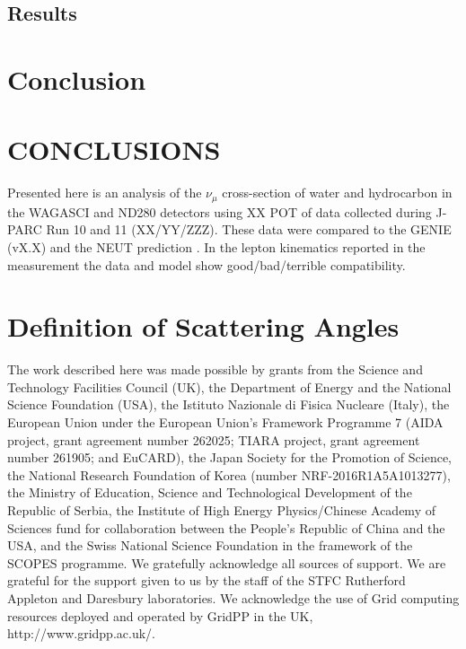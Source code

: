 \documentclass[%
 reprint,
 amsmath,amssymb,
 aps,
]{revtex4-2}
\begin{document}
\subsection{Results}

\section{\label{Sect:Results}Conclusion}

\section{\label{Sect:Conclusions}CONCLUSIONS}

Presented here is an analysis of the $\nu_{\mu}$ cross-section of water and hydrocarbon in the WAGASCI and ND280 detectors using XX POT of data collected during J-PARC Run 10 and 11 (XX/YY/ZZZ). These data were compared to the GENIE (vX.X) \cite{} and the NEUT prediction \cite{}. In the lepton kinematics reported in the measurement the data and model show good/bad/terrible compatibility. 
\newpage
\appendix*

\section{\label{Sect:Appendix}Definition of Scattering Angles}


\begin{acknowledgments}
The work described here was made possible by grants from the Science and Technology Facilities Council (UK), the Department of Energy and the National Science Foundation (USA), the Istituto Nazionale di Fisica Nucleare (Italy), the European Union under the European Union’s Framework Programme 7 (AIDA project, grant agreement number 262025; TIARA project, grant agreement number 261905; and EuCARD), the Japan Society for the Promotion of Science, the National Research Foundation of Korea (number NRF-2016R1A5A1013277), the Ministry of Education, Science and Technological Development of the Republic of Serbia, the Institute of High Energy Physics/Chinese Academy of Sciences fund for collaboration between the People’s Republic of China and the USA, and the Swiss National Science Foundation in the framework of the SCOPES programme. We gratefully acknowledge all sources of support. We are grateful for the support given to us by the staff of the STFC Rutherford Appleton and Daresbury laboratories. We acknowledge the use of Grid computing resources deployed and operated by GridPP in the UK, http://www.gridpp.ac.uk/.

\end{acknowledgments}
\end{document}
